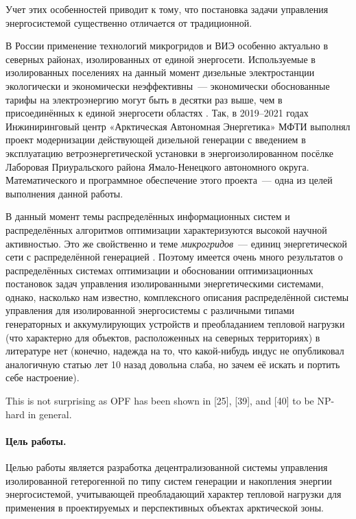 Учет этих особенностей приводит к тому, что постановка задачи управления энергосистемой существенно отличается от традиционной.

В России применение технологий микрогридов и ВИЭ особенно актуально в северных районах, изолированных от единой энергосети.
Используемые в изолированных поселениях на данный момент дизельные электростанции экологически и экономически неэффективны~--- экономически обоснованные тарифы на электроэнергию могут быть в десятки раз выше, чем в присоединённых к единой энергосети областях \cite[15]{ancenter2017tarifes}.
Так, в 2019--2021 годах Инжиниринговый центр «Арктическая Автономная Энергетика» МФТИ выполнял проект модернизации действующей дизельной генерации с введением в эксплуатацию ветроэнергетической установки в энергоизолированном посёлке Лаборовая Приуральского района Ямало-Ненецкого автономного округа.
Математического и программное обеспечение этого проекта~--- одна из целей выполнения данной работы.

В данный момент темы распределённых информационных систем и распределённых алгоритмов оптимизации характеризуются высокой научной активностью.
Это же свойственно и теме \textit{микрогридов}~--- единиц энергетической сети с распределённой генерацией \cite{lasseter2002microgrids}.
Поэтому имеется очень много результатов о распределённых системах оптимизации и обосновании оптимизационных постановок задач управления изолированными энергетическими системами, однако, насколько нам известно, комплексного описания распределённой системы управления для изолированной энергосистемы с различными типами генераторных и аккумулирующих устройств и преобладанием тепловой нагрузки (что характерно для объектов, расположенных на северных территориях) в литературе нет (конечно, надежда на то, что какой-нибудь индус не опубликовал аналогичную статью лет 10 назад довольна слаба, но зачем её искать и портить себе настроение). 



This is not surprising as OPF has been
shown in [25], [39], and [40] to be NP-hard in general. \cite{lehmann2015ac}

 
 
 
 \paragraph{Цель работы.}
 Целью работы является разработка децентрализованной системы управления изолированной гетерогенной по типу систем генерации и накопления энергии энергосистемой, учитывающей преобладающий характер тепловой нагрузки для применения в проектируемых и перспективных объектах арктической зоны.
 

